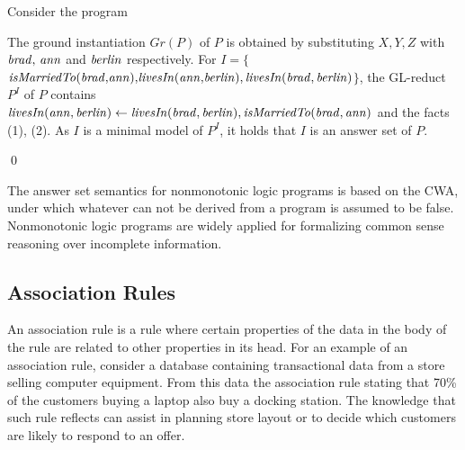 \begin{example}\label{ex:as}
Consider the program \\
{\small {}}
            
\normalsize
{\smallskip

\noindent            
The ground instantiation $Gr(P)$ of $P$ is obtained by substituting $X,Y,Z$ with $\mathit{brad, \,ann}$ and $\mathit{berlin}$ respectively. For $I{=}\{${\small$\mathit{isMarriedTo(brad{,}ann){,}livesIn(ann{,}berlin)},\\ \mathit{livesIn(brad,berlin)}$}$\}$, the GL-reduct $P^I$ of $P$ contains $\mathit{livesIn(ann,berlin)}\leftarrow \mathit{livesIn(brad,berlin),isMarriedTo(brad,ann)}$ and the facts (1), (2). As $I$ is a minimal model of $P^I$, it holds that $I$ is an answer set of $P$.}\qed
\end{example}
\normalsize

The answer set semantics for nonmonotonic logic programs is based on the CWA, under which whatever can not be derived from a program is assumed to be false. Nonmonotonic logic programs are widely applied for formalizing common sense reasoning over incomplete information.
\subsection{Association Rules}



An association rule is a rule where certain properties of the data in the body of
the rule are related to other properties in its head. For an example of an association rule, consider a
database containing transactional data from a store selling computer equipment.
From this data the association rule stating that 70\% of the customers
buying a laptop also buy a docking station. The knowledge that such rule reflects 
can assist in planning store layout or to decide which customers are likely to respond to an
offer.


